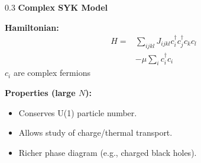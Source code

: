 \documentclass[aspectratio=169]{beamer}
\begin{document}
\begin{frame}
\begin{columns}[T]
\begin{column}{0.3\textwidth}
    \centering
    \textbf{Complex SYK Model}
    \vspace{0.2cm} %
    
    \textbf{Hamiltonian:}
    \begin{align*}
        H =& \sum_{ijkl} J_{ijkl} c_i^\dagger c_j^\dagger c_k c_l \\
        &- \mu \sum_i c_i^\dagger c_i
    \end{align*}
    $c_i$ are complex fermions
    
    \vspace{0.3cm}
    \textbf{Properties  (large $N$):}
    \begin{itemize}
        \item Conserves U(1) particle number.
        \item Allows study of charge/thermal transport.
        \item Richer phase diagram (e.g., charged black holes).
    \end{itemize}
\end{column}

\end{columns}
\end{frame}
\end{document}
